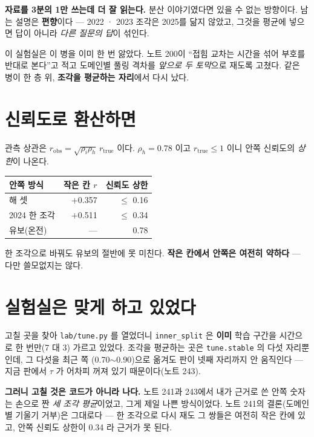 \documentclass[10pt]{article}
\begin{document}
\textbf{자료를 3분의 1만 쓰는데 더 잘 읽는다.} 분산 이야기였다면 있을 수
없는 방향이다. 남는 설명은 \textbf{편향}이다 --- 2022 · 2023 조각은 2025를
닮지 않았고, 그것을 평균에 넣으면 답이 아니라 \emph{다른 질문의 답}이
섞인다.

이 실험실은 이 병을 이미 한 번 앓았다. 노트 200이 ``접힘 교차는 시간을 섞어
부호를 반대로 본다''고 적고 도메인별 풀링 격차를 \emph{앞으로 두 토막}으로
재도록 고쳤다. 같은 병이 한 층 위, \textbf{조각을 평균하는 자리}에서 다시
났다.

\section{신뢰도로 환산하면}

관측 상관은 $r_{\text{obs}} = \sqrt{\rho_i \rho_h}\, r_{\text{true}}$ 이다.
$\rho_h = 0.78$ 이고 $r_{\text{true}} \le 1$ 이니 안쪽 신뢰도의 \emph{상한}이
나온다.

\begin{center}\small
\begin{tabular}{lrr}
\hline
안쪽 방식 & 작은 칸 $r$ & 신뢰도 상한 \\
\hline
해 셋 & $+$0.357 & $\le$ 0.16 \\
2024 한 조각 & $+$0.511 & $\le$ 0.34 \\
유보(온전) & --- & 0.78 \\
\hline
\end{tabular}
\end{center}

한 조각으로 바꿔도 유보의 절반에 못 미친다. \textbf{작은 칸에서 안쪽은
여전히 약하다} --- 다만 쓸모없지는 않다.

\section{실험실은 맞게 하고 있었다}

고칠 곳을 찾아 \texttt{lab/tune.py} 를 열었더니 \texttt{inner\_split} 은
\textbf{이미} 학습 구간을 시간으로 한 번만(7 대 3) 가르고 있었다. 조각을
평균하는 곳은 \texttt{tune.stable} 의 다섯 자리뿐인데, 그 다섯을 최근 쪽
(0.70$\sim$0.90)으로 옮겨도 판이 넷째 자리까지 안 움직인다 --- 지금 판에서
$\tau$ 가 어차피 꺼져 있기 때문이다(노트 243).

\textbf{그러니 고칠 것은 코드가 아니라 나다.} 노트 241과 243에서 내가 근거로
쓴 안쪽 숫자는 손으로 짠 \emph{세 조각 평균}이었고, 그게 제일 나쁜 방식이었다.
노트 241의 결론(도메인별 기울기 거부)은 그대로다 --- 한 조각으로 다시 재도
그 쌍들은 여전히 작은 칸에 있고, 안쪽 신뢰도 상한이 0.34 라 근거가 못 된다.
\end{document}
